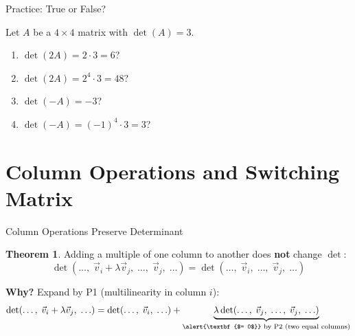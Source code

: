 \documentclass[10pt]{beamer}
\theoremstyle{definition}
\newtheorem{thm}{Theorem}[section]
\newcommand{\x}[1]{\alert{\textbf{#1}}}
\begin{document}
\begin{frame}{Practice: True or False?}

Let $A$ be a $4\times 4$ matrix with $\det(A)=3$.

\vfill

\begin{enumerate}
\item $\det(2A) = 2 \cdot 3 = 6$?

\vfill

\item $\det(2A) = 2^4 \cdot 3 = 48$?

\vfill

\item $\det(-A) = -3$?

\vfill

\item $\det(-A) = (-1)^4 \cdot 3 = 3$?
\end{enumerate}

\vfill

\end{frame}


\section{Column Operations and Switching Matrix}

\begin{frame}{Column Operations Preserve Determinant}

\begin{thm}
Adding a multiple of one column to another does \x{not} change $\det$:
$$
\det(\ldots,\; \vec{v}_i + \lambda\vec{v}_j,\; \ldots,\; \vec{v}_j,\; \ldots)
= \det(\ldots,\; \vec{v}_i,\; \ldots,\; \vec{v}_j,\; \ldots)
$$
\end{thm}

\vfill
\pause

\textbf{Why?} Expand by P1 (multilinearity in column $i$):
$$
\det(\ldots,\; \vec{v}_i + \lambda\vec{v}_j,\; \ldots)
= \det(\ldots,\; \vec{v}_i,\; \ldots)
+ \underbrace{\lambda\det(\ldots,\; \vec{v}_j,\; \ldots,\; \vec{v}_j,\; \ldots)}_{\x{$= 0$} \text{ by P2 (two equal columns)}}
$$

\end{frame}
\end{document}
